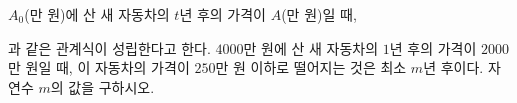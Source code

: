 $A_0$(만 원)에 산 새 자동차의 $t$년 후의 가격이 $A$(만 원)일 때, \par\smallskip{}\par\smallskip\noindent 과 같은 관계식이 성립한다고 한다. $4000$만 원에 산 새 자동차의 $1$년 후의 가격이 $2000$만 원일 때, 이 자동차의 가격이 $250$만 원 이하로 떨어지는 것은 최소 $m$년 후이다. 자연수 $m$의 값을 구하시오.
